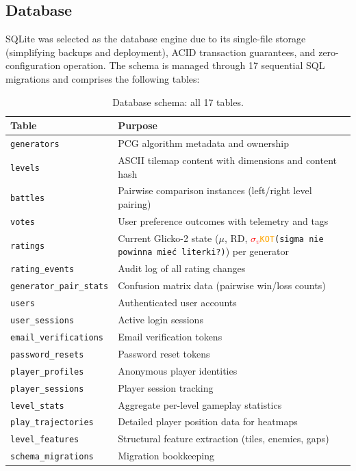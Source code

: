 \documentclass[shortabstract, mgr, english]{iithesis}
\newcommand{\DEBUG}[1]{{#1}} %
\newcommand{\KOT}[1]{\DEBUG{\tt{\textcolor{orange}{KOT}(}{#1}{)}}}
\newcommand{\changed}[1]{\textcolor{red}{#1}}
\begin{document}
\subsection{Database}
\label{subsec:sd-database}

SQLite was selected as the database engine due to its single-file storage (simplifying
backups and deployment), ACID transaction guarantees, and zero-configuration operation.
The schema is managed through 17 sequential SQL migrations and comprises the following
tables:

\begin{table}[H]
\centering
\small
\begin{tabular}{ll}
\toprule
\textbf{Table} & \textbf{Purpose} \\
\midrule
\texttt{generators}          & PCG algorithm metadata and ownership \\
\texttt{levels}              & ASCII tilemap content with dimensions and content hash \\
\texttt{battles}             & Pairwise comparison instances (left/right level pairing) \\
\texttt{votes}               & User preference outcomes with telemetry and tags \\
\texttt{ratings}             & Current Glicko-2 state ($\mu$, RD, \changed{$\sigma_v$}\KOT{sigma nie powinna mieć literki?}) per generator \\
\texttt{rating\_events}      & Audit log of all rating changes \\
\texttt{generator\_pair\_stats} & Confusion matrix data (pairwise win/loss counts) \\
\texttt{users}               & Authenticated user accounts \\
\texttt{user\_sessions}      & Active login sessions \\
\texttt{email\_verifications}& Email verification tokens \\
\texttt{password\_resets}    & Password reset tokens \\
\texttt{player\_profiles}    & Anonymous player identities \\
\texttt{player\_sessions}    & Player session tracking \\
\texttt{level\_stats}        & Aggregate per-level gameplay statistics \\
\texttt{play\_trajectories}  & Detailed player position data for heatmaps \\
\texttt{level\_features}     & Structural feature extraction (tiles, enemies, gaps) \\
\texttt{schema\_migrations}  & Migration bookkeeping \\
\bottomrule
\end{tabular}
\caption{Database schema: all 17 tables.}
\label{tab:db-tables}
\end{table}
\end{document}
